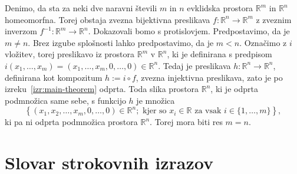 \documentclass[mat1]{fmfdelo}
\newcommand{\literatura}{literatura}  %
\newcommand{\R}{\mathbb R}
\newcommand{\0}{0}
\begin{document}
\begin{dokaz}
Denimo, da sta za neki dve naravni števili $m$ in $n$ evklidska prostora $\R^m$ in $\R^n$ homeomorfna. Torej obstaja zvezna bijektivna preslikava $f : \R^n \to \R^m$ z zveznim inverzom $f^{-1} : \R^m \to \R^n$. Dokazovali bomo s protislovjem. Predpostavimo, da je $m \neq n$. Brez izgube splošnosti lahko predpostavimo, da je $m < n$. Označimo z $i$ vložitev, torej preslikavo iz prostora $\R^m$ v $\R^n$, ki je definirana s predpisom $i(x_1, \dots, x_m) = (x_1, \dots, x_m, 0, \dots, 0) \in \R^n$. Tedaj je preslikava $h : \R^n \to \R^n$, definirana kot kompozitum $h := i \circ f$, zvezna injektivna preslikava, zato je po izreku~\ref{izr:main-theorem} odprta. Toda slika prostora $\R^n$, ki je odprta podmnožica same sebe, s funkcijo $h$ je množica 
$$\left \{ (x_1, x_2, \dots, x_m, 0, \dots, 0) \in \R^n ; \text{ kjer so } x_i \in \R \text{ za vsak } i \in \{1, \dots, m \}  \right \},$$
 ki pa ni odprta podmnožica prostora $\R^n$. Torej mora biti res $m = n$.
\end{dokaz}
\section*{Slovar strokovnih izrazov}



        
\end{document}
